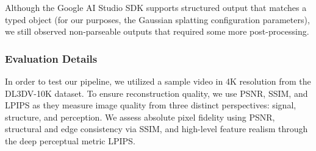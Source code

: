 \noindent Although the Google AI Studio SDK supports structured output that matches a typed object (for our purposes, the Gaussian splatting configuration parameters), we still observed non-parseable outputs that required some more post-processing.


\subsubsection{Evaluation Details}
\noindent In order to test our pipeline, we utilized a sample video in 4K resolution from the DL3DV-10K dataset. To ensure reconstruction quality, we use PSNR, SSIM, and LPIPS as they measure image quality from three distinct perspectives: signal, structure, and perception. We assess absolute pixel fidelity using PSNR, structural and edge consistency via SSIM, and high-level feature realism through the deep perceptual metric LPIPS.